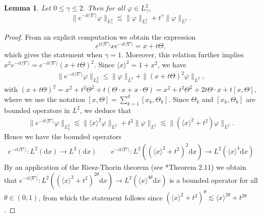 \documentclass[12pt]{article}
\theoremstyle{plain}
\newtheorem{lemma}[theo]{Lemma}
\begin{document}
\begin{lemma}\label{lm:xgamma-lin}
Let $0\leq \gamma\leq 2$. Then for all $\varphi\in L^2_\gamma$,
\begin{equation}\label{eq:xgamma-lin}
    \big\| e^{-it\langle\nabla\rangle}\varphi\|_{L^2_\gamma}\lesssim \|\varphi\|_{L^2_\gamma}+t^\gamma\|\varphi\|_{L^2}.
\end{equation}
\end{lemma}	
\begin{proof}
From an explicit computation we obtain the expression
\begin{equation*}
e^{it\langle\nabla\rangle}xe^{-it\langle\nabla\rangle}=x+t\Theta,
\end{equation*}
which gives the statement when $\gamma = 1$. Moreover, this relation further implies $x^2e^{-it\langle\nabla\rangle} = e^{-it\langle\nabla\rangle} (x+t\Theta)^2$. Since $\langle x \rangle^2 = 1 + x^2$, we have
\begin{align}
\label{comp: x^2 free prop}
    \big\|e^{-it\langle\nabla\rangle}\varphi\|_{L^2_2}\le \|\varphi\|_{L^2} + \|(x+t\Theta)^2\varphi\|_{L^2}, 
\end{align}
with $(x+t\Theta)^2 = x^2  + t^2 \Theta^2 + t(\Theta\cdot x  + x\cdot \Theta)=x^2  + t^2 \Theta^2 + 2t\Theta\cdot x  + t[x,\Theta]$,
where we use the notation $[x,\Theta] = \sum_{k=1}^d [x_k,\Theta_k]$. 
Since $\Theta_k$ and $[x_k,\Theta_k]$ are bounded operators in $L^2$, we deduce that
\begin{align}
    \big\|e^{-it\langle\nabla\rangle}\varphi\|_{L^2_2} \lesssim \|\langle x\rangle^2\varphi\|_{L^2}+t^2\|\varphi\|_{L^2}\lesssim\|(\langle x \rangle^2 + t^2 ) \varphi\|_{L^2}. 
\end{align}
Hence we have the bounded operators 
\begin{align*}
    e^{-it\langle\nabla\rangle} :L^2(\mathrm{d}x) \to L^2(\mathrm{d}x) \qquad e^{-it\langle\nabla\rangle}: L^2 ((\langle x \rangle^2 + t^2 )^2 \mathrm{d}x) \to  L^2 (\langle x \rangle^4 \mathrm{d}x)
\end{align*}
By an application of the Riesz-Thorin theorem (see \cite{stein_weiss}*{Theorem 2.11}) we obtain that $e^{-it\langle\nabla\rangle}: L^2 ((\langle x \rangle^2 + t^2 )^{2\theta} \mathrm{d}x) \to  L^2 (\langle x \rangle^{4\theta} \mathrm{d}x)$ is a bounded operator for all $\theta \in (0,1)$, from which the statement follows since $(\langle x \rangle^2 + t^2 )^{\theta} \lesssim \langle x \rangle^{2\theta} + t^{2\theta}$. 
\end{proof}	
\end{document}
